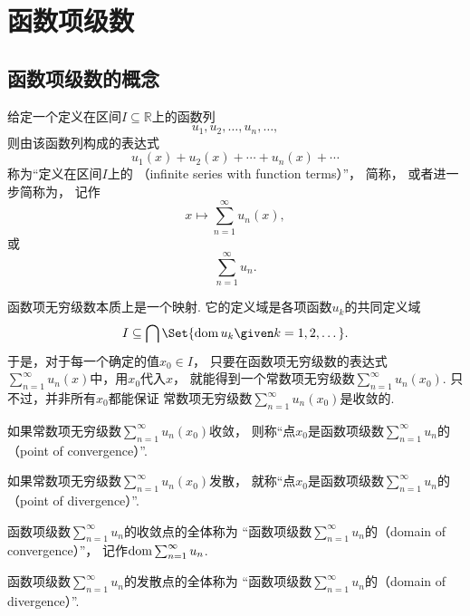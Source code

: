 \section{函数项级数}
\subsection{函数项级数的概念}
\begin{definition}\label{definition:无穷级数.实函数项级数的概念}
给定一个定义在区间\(I \subseteq \mathbb{R}\)上的函数列\[
	u_1,u_2,\dotsc,u_n,\dotsc,
\]
则由该函数列构成的表达式\[
	u_1(x)+u_2(x)+\dotsb+u_n(x)+\dotsb
\]
称为“定义在区间\(I\)上的
（infinite series with function terms）”，
简称，
或者进一步简称为，
记作\[
	x \mapsto \sum_{n=1}^\infty u_n(x),
\]
或\[
	\sum_{n=1}^\infty u_n.
\]
\end{definition}
\begin{remark}
函数项无穷级数本质上是一个映射.
它的定义域是各项函数\(u_k\)的共同定义域\[
	I \subseteq \bigcap\Set{ \dom u_k \given k=1,2,\dotsc }.
\]
于是，对于每一个确定的值\(x_0 \in I\)，
只要在函数项无穷级数的表达式\(\sum_{n=1}^\infty u_n(x)\)中，用\(x_0\)代入\(x\)，
就能得到一个常数项无穷级数\(\sum_{n=1}^\infty u_n(x_0)\).
只不过，并非所有\(x_0\)都能保证
常数项无穷级数\(\sum_{n=1}^\infty u_n(x_0)\)是收敛的.
\end{remark}

\begin{definition}
如果常数项无穷级数\(\sum_{n=1}^\infty u_n(x_0)\)收敛，
则称“点\(x_0\)是函数项级数\(\sum_{n=1}^\infty u_n\)的
（point of convergence）”.

如果常数项无穷级数\(\sum_{n=1}^\infty u_n(x_0)\)发散，
就称“点\(x_0\)是函数项级数\(\sum_{n=1}^\infty u_n\)的
（point of divergence）”.

函数项级数\(\sum_{n=1}^\infty u_n\)的收敛点的全体称为
“函数项级数\(\sum_{n=1}^\infty u_n\)的（domain of convergence）”，
记作\(\operatorname{dom} \sum_{n=1}^\infty u_n\).

函数项级数\(\sum_{n=1}^\infty u_n\)的发散点的全体称为
“函数项级数\(\sum_{n=1}^\infty u_n\)的（domain of divergence）”.
\end{definition}


